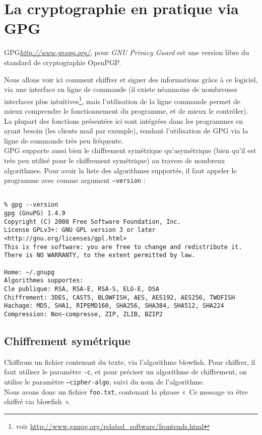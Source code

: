 \chapter{La cryptographie en pratique via GPG}
GPG\emph{\url{http://www.gnupg.org/}}, pour 
\emph{GNU Privacy Guard} est une version libre du
standard de cryptographie OpenPGP.

Nous allons voir ici comment chiffrer et signer des informations 
grâce à ce
logiciel, via une interface en ligne de commande (il existe
néanmoins de nombreuses interfaces plus intuitives\footnote{voir
\url{http://www.gnupg.org/related_software/frontends.html}}, mais
l'utilisation de la ligne commande permet de mieux comprendre le
fonctionnement du programme, et de mieux le contrôler).
La plupart des fonctions présentées ici sont intégrées dans les
programmes en ayant besoin (les clients mail par exemple), rendant
l'utilisation de GPG via la ligne de commande très peu fréquente.
\\

GPG supporte aussi bien le chiffrement symétrique qu'asymétrique
(bien qu'il est très peu utilisé pour le chiffrement symétrique)
au travers de nombreux algorithmes. Pour avoir la liste des
algorithmes supportés, il faut appeler le programme avec comme
argument \texttt{--version} : 

\lstset{language=bash}
\begin{lstlisting}

% gpg --version 
gpg (GnuPG) 1.4.9
Copyright (C) 2008 Free Software Foundation, Inc.
License GPLv3+: GNU GPL version 3 or later
<http://gnu.org/licenses/gpl.html>
This is free software: you are free to change and redistribute it.
There is NO WARRANTY, to the extent permitted by law.

Home: ~/.gnupg
Algorithmes supportes:
Cle publique: RSA, RSA-E, RSA-S, ELG-E, DSA
Chiffrement: 3DES, CAST5, BLOWFISH, AES, AES192, AES256, TWOFISH
Hachage: MD5, SHA1, RIPEMD160, SHA256, SHA384, SHA512, SHA224
Compression: Non-compresse, ZIP, ZLIB, BZIP2

\end{lstlisting}

\section{Chiffrement symétrique}
Chiffrons un fichier contenant du texte, via l'algorithme
blowfish. Pour chiffrer, il faut utiliser le paramètre
\texttt{-c}, et pour préciser un algorithme de chiffrement, on
utilise le paramètre \texttt{--cipher-algo}, suivi du nom de
l'algorithme.\\
Nous avons donc un fichier \texttt{foo.txt}, contenant la phrase
«~Ce message va être chiffré via blowfish~».

